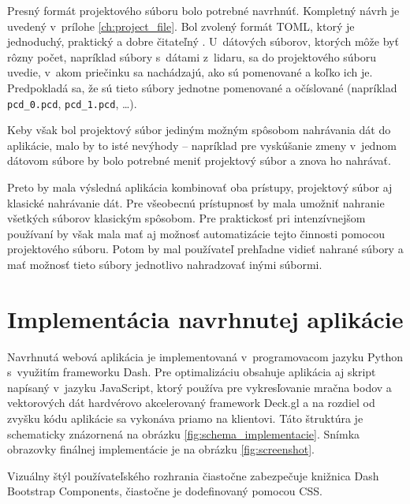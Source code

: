Presný formát projektového súboru bolo potrebné navrhnúť. Kompletný návrh je uvedený v~prílohe \ref{ch:project_file}. Bol zvolený formát TOML, ktorý je jednoduchý, praktický a dobre čitateľný \cite{toml}. U~dátových súborov, ktorých môže byť rôzny počet, napríklad súbory s~dátami z~lidaru, sa do projektového súboru uvedie, v~akom priečinku sa nachádzajú, ako sú pomenované a koľko ich je. Predpokladá sa, že sú tieto súbory jednotne pomenované a očíslované (napríklad \texttt{pcd\_0.pcd}, \texttt{pcd\_1.pcd}, \dots).

Keby však bol projektový súbor jediným možným spôsobom nahrávania dát do aplikácie, malo by to isté nevýhody -- napríklad pre vyskúšanie zmeny v~jednom dátovom súbore by bolo potrebné meniť projektový súbor a znova ho nahrávať.

Preto by mala výsledná aplikácia kombinovať oba prístupy, projektový súbor aj klasické nahrávanie dát. Pre všeobecnú prístupnosť by mala umožniť nahranie všetkých súborov klasickým spôsobom. Pre praktickosť pri intenzívnejšom používaní by však mala mať aj možnosť automatizácie tejto činnosti pomocou projektového súboru. Potom by mal používateľ prehľadne vidieť nahrané súbory a mať možnosť tieto súbory jednotlivo nahradzovať inými súbormi.

\chapter{Implementácia navrhnutej aplikácie}
\label{ch:implementacia}

Navrhnutá webová aplikácia je implementovaná v~programovacom jazyku Python s~využitím frameworku Dash. Pre optimalizáciu obsahuje aplikácia aj skript napísaný v~jazyku JavaScript, ktorý používa pre vykresľovanie mračna bodov a vektorových dát hardvérovo akcelerovaný framework Deck.gl a na rozdiel od zvyšku kódu aplikácie sa vykonáva priamo na klientovi. Táto štruktúra je schematicky znázornená na obrázku \ref{fig:schema_implementacie}. Snímka obrazovky finálnej implementácie je na obrázku \ref{fig:screenshot}.

Vizuálny štýl používateľského rozhrania čiastočne zabezpečuje knižnica Dash Bootstrap Components, čiastočne je dodefinovaný pomocou CSS.

